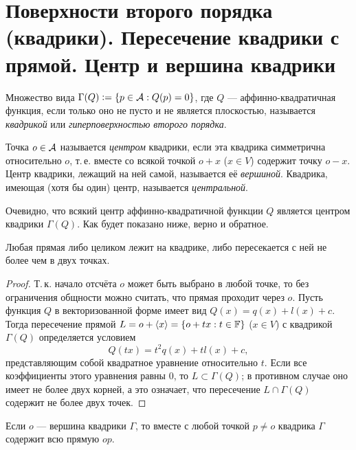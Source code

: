\section{Поверхности второго порядка (квадрики). Пересечение квадрики с прямой. Центр и вершина квадрики}

\begin{definition}
    Множество вида $\Gamma(Q) \vcentcolon = \{p \in \mathcal{A} : Q(p) = 0\}$, где $Q$ --- аффинно-квадратичная функция, если только оно не пусто и не является плоскостью, называется \textit{квадрикой} или \textit{гиперповерхностью второго порядка}.
\end{definition}

\begin{definition}
    Точка $o \in \mathcal{A}$ называется \textit{центром} квадрики, если эта квадрика симметрична относительно $o$, т.\,е. вместе со всякой точкой $o + x$ ($x \in V$) содержит точку $o - x$. Центр квадрики, лежащий на ней самой, называется её \textit{вершиной}. Квадрика, имеющая (хотя бы один) центр, называется \textit{центральной}.
\end{definition}

Очевидно, что всякий центр аффинно-квадратичной функции $Q$ является центром квадрики $\Gamma(Q)$. Как будет показано ниже, верно и обратное.

\begin{proposal}
    Любая прямая либо целиком лежит на квадрике, либо пересекается с ней не более чем в двух точках.
\end{proposal}

\begin{proof}
    Т.\,к. начало отсчёта $o$ может быть выбрано в любой точке, то без ограничения общности можно считать, что прямая проходит через $o$. Пусть функция $Q$ в векторизованной форме имеет вид $Q(x) = q(x) + l(x) + c$. Тогда пересечение прямой $L = o + \langle x\rangle = \{o + tx : t \in \mathbb{F}\}$ ($x \in V$) с квадрикой $\Gamma(Q)$ определяется условием
    \[
        Q(tx) = t^2q(x) + tl(x) + c,
    \]
    представляющим собой квадратное уравнение относительно $t$. Если все коэффициенты этого уравнения равны $0$, то $L \subset \Gamma(Q)$; в противном случае оно имеет не более двух корней, а это означает, что пересечение $L \cap \Gamma(Q)$ содержит не более двух точек.
\end{proof}

\begin{proposal}
    Если $o$ --- вершина квадрики $\Gamma$, то вместе с любой точкой $p \ne o$ квадрика $\Gamma$ содержит всю прямую $op$.
\end{proposal}

